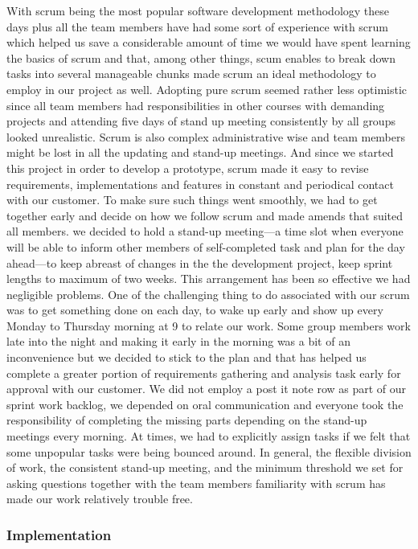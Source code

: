 With scrum being the most popular software development methodology these days plus all the team members have had some sort of experience with scrum which helped us save a considerable amount of time we would have spent learning the basics of scrum and that, among other things, scum enables to break down tasks into several manageable chunks made scrum an ideal methodology to employ in our project as well. Adopting pure scrum seemed rather less optimistic since all team members had responsibilities in other courses with demanding projects and attending five days of stand up meeting consistently by all groups looked unrealistic. Scrum is also complex administrative wise and team members might be lost in all the updating and stand-up meetings. And since we started this project in order to develop a prototype, scrum made it easy to revise requirements, implementations and features in constant and periodical contact with our customer. To make sure such things went smoothly, we had to get together early and decide on how we follow scrum and made amends that suited all members. we decided to hold a stand-up meeting---a time slot when everyone will be able to inform other members of self-completed task and plan for the day ahead---to keep abreast of changes in the the development project, keep sprint lengths to maximum of two weeks. This arrangement has been so effective we had negligible problems. One of the challenging thing to do associated with our scrum was to get something done on each day, to wake up early and show up every Monday to Thursday morning at 9 to relate our work. Some group members work late into the night and making it early in the morning was a bit of an inconvenience but we decided to stick to the plan and that has helped us complete a greater portion of requirements gathering and analysis task early for approval with our customer. We did not employ a post it note row as part of our sprint work backlog, we depended on oral communication and everyone took the responsibility of completing the missing parts depending on the stand-up meetings every morning. At times, we had to explicitly assign tasks if we felt that some unpopular tasks were being bounced around. In general, the flexible division of work, the consistent stand-up meeting, and the minimum threshold we set for asking questions together with the team members familiarity with scrum has made our work relatively trouble free.
	\subsubsection{Implementation}
